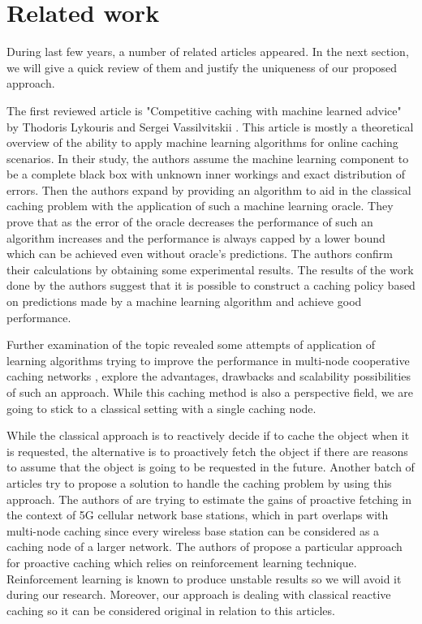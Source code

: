 \section{Related work}

During last few years, a number of related articles appeared. In the next section, we will give a quick review of them and justify the uniqueness of our proposed approach.

The first reviewed article is "Competitive caching with machine learned advice" by Thodoris Lykouris and Sergei Vassilvitskii \cite{18}. This article is mostly a theoretical overview of the ability to apply machine learning algorithms for online caching scenarios. In their study, the authors assume the machine learning component to be a complete black box with unknown inner workings and exact distribution of errors. Then the authors expand by providing an algorithm to aid in the classical caching problem with the application of such a machine learning oracle. They prove that as the error of the oracle decreases the performance of such an algorithm increases and the performance is always capped by a lower bound which can be achieved even without oracle's predictions. The authors confirm their calculations by obtaining some experimental results. The results of the work done by the authors suggest that it is possible to construct a caching policy based on predictions made by a machine learning algorithm and achieve good performance.

Further examination of the topic revealed some attempts of application of learning algorithms trying to improve the performance in multi-node cooperative caching networks \cite{19}, explore the advantages, drawbacks and scalability possibilities of such an approach. While this caching method is also a perspective field, we are going to stick to a classical setting with a single caching node.

While the classical approach is to reactively decide if to cache the object when it is requested, the alternative is to proactively fetch the object if there are reasons to assume that the object is going to be requested in the future. Another batch of articles \cite{20, 21} try to propose a solution to handle the caching problem by using this approach. The authors of \cite{20} are trying to estimate the gains of proactive fetching in the context of 5G cellular network base stations, which in part overlaps with multi-node caching since every wireless base station can be considered as a caching node of a larger network. The authors of \cite{21} propose a particular approach for proactive caching which relies on reinforcement learning technique. Reinforcement learning is known to produce unstable results so we will avoid it during our research. Moreover, our approach is dealing with classical reactive caching so it can be considered original in relation to this articles.

